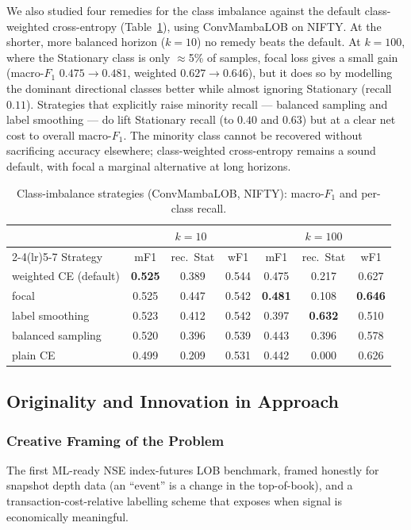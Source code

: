 \documentclass[11pt]{article}
\begin{document}
We also studied four remedies for the class imbalance against the default class-weighted cross-entropy
(Table~\ref{tab:imb}), using ConvMambaLOB on NIFTY. At the shorter, more balanced horizon ($k{=}10$) no remedy
beats the default. At $k{=}100$, where the Stationary class is only $\approx$5\% of samples, focal loss gives
a small gain (macro-$F_1$ $0.475\!\rightarrow\!0.481$, weighted $0.627\!\rightarrow\!0.646$), but it does so by
modelling the dominant directional classes better while almost ignoring Stationary (recall $0.11$).
Strategies that explicitly raise minority recall --- balanced sampling and label smoothing --- do lift
Stationary recall (to $0.40$ and $0.63$) but at a clear net cost to overall macro-$F_1$. The minority class
cannot be recovered without sacrificing accuracy elsewhere; class-weighted cross-entropy remains a sound
default, with focal a marginal alternative at long horizons.
\begin{table}[h]
\centering
\caption{Class-imbalance strategies (ConvMambaLOB, NIFTY): macro-$F_1$ and per-class recall.}
\label{tab:imb}
\begin{tabular}{@{}lcccccc@{}}
\toprule
& \multicolumn{3}{c}{$k{=}10$} & \multicolumn{3}{c}{$k{=}100$} \\
\cmidrule(lr){2-4}\cmidrule(lr){5-7}
Strategy & mF1 & rec.\ Stat & wF1 & mF1 & rec.\ Stat & wF1 \\
\midrule
weighted CE (default) & \textbf{0.525} & 0.389 & 0.544 & 0.475 & 0.217 & 0.627 \\
focal                 & 0.525 & 0.447 & 0.542 & \textbf{0.481} & 0.108 & \textbf{0.646} \\
label smoothing       & 0.523 & 0.412 & 0.542 & 0.397 & \textbf{0.632} & 0.510 \\
balanced sampling     & 0.520 & 0.396 & 0.539 & 0.443 & 0.396 & 0.578 \\
plain CE              & 0.499 & 0.209 & 0.531 & 0.442 & 0.000 & 0.626 \\
\bottomrule
\end{tabular}
\end{table}

\subsection{Originality and Innovation in Approach}
\subsubsection{Creative Framing of the Problem}
The first ML-ready NSE index-futures LOB benchmark, framed honestly for snapshot depth data (an ``event''
is a change in the top-of-book), and a transaction-cost-relative labelling scheme that exposes when signal
is economically meaningful.
\end{document}
